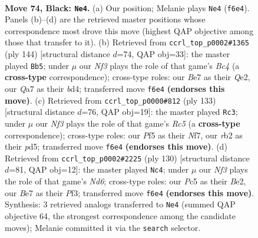 \documentclass[11pt]{article}
\begin{document}
\clearpage

\begin{figure}[p]\centering
\begin{subfigure}{0.46\textwidth}\centering
\resizebox{\linewidth}{!}{%
\newchessgame
\chessboard[
  setfen={r7/q3b1k1/4Qn2/P1p2p2/3p1Pp1/8/1R1BP3/3NK3 b - - 9 74},
  showmover=false,
  pgfstyle=straightmove, color=movearrow, markmove={f6-e4}
]}
\caption{}
\end{subfigure}\hfill
\begin{subfigure}{0.46\textwidth}\centering
\resizebox{\linewidth}{!}{%
\newchessgame
\chessboard[
  setfen={8/1p3pk1/6p1/3Pp3/PqBbP3/6P1/4QPK1/8 w - - 45 73},
  showmover=false,
  pgfstyle=straightmove, color=movearrow, markmove={c4-b5}
]}
\caption{}
\end{subfigure}
\\[4pt]
\begin{subfigure}{0.46\textwidth}\centering
\resizebox{\linewidth}{!}{%
\newchessgame
\chessboard[
  setfen={6k1/2pq1n2/1p3b2/3P1Pp1/1Pr5/p4BB1/P3Q1K1/7R b - - 1 67},
  showmover=false,
  pgfstyle=straightmove, color=movearrow, markmove={c4-c3}
]}
\caption{}
\end{subfigure}\hfill
\begin{subfigure}{0.46\textwidth}\centering
\resizebox{\linewidth}{!}{%
\newchessgame
\chessboard[
  setfen={8/3nkpp1/1p1Nb2p/1P6/3Q3P/q4PP1/4BK2/8 w - - 9 66},
  showmover=false,
  pgfstyle=straightmove, color=movearrow, markmove={d6-c4}
]}
\caption{}
\end{subfigure}
\caption{\textbf{Move 74, Black: \texttt{Ne4}.} (a) Our position; Melanie plays \texttt{Ne4} (\texttt{f6e4}). Panels (b)--(d) are the retrieved master positions whose correspondence most drove this move (highest QAP objective among those that transfer to it). (b) Retrieved from \texttt{ccrl\_top\_p0002\#1365} (ply 144) [structural distance $d$=74, QAP obj=33]: the master played \texttt{Bb5}; under $\mu$ our \emph{Nf3} plays the role of that game's \emph{Bc4} (a \textbf{cross-type} correspondence); cross-type roles: our \emph{B}e7 as their \emph{Q}e2, our \emph{Q}a7 as their \emph{b}d4; transferred move \texttt{f6e4} \textbf{(endorses this move)}. (c) Retrieved from \texttt{ccrl\_top\_p0000\#812} (ply 133) [structural distance $d$=76, QAP obj=19]: the master played \texttt{Rc3}; under $\mu$ our \emph{Nf3} plays the role of that game's \emph{Rc5} (a \textbf{cross-type} correspondence); cross-type roles: our \emph{P}f5 as their \emph{N}f7, our \emph{r}b2 as their \emph{p}d5; transferred move \texttt{f6e4} \textbf{(endorses this move)}. (d) Retrieved from \texttt{ccrl\_top\_p0002\#2225} (ply 130) [structural distance $d$=81, QAP obj=12]: the master played \texttt{Nc4}; under $\mu$ our \emph{Nf3} plays the role of that game's \emph{Nd6}; cross-type roles: our \emph{P}c5 as their \emph{B}e2, our \emph{B}e7 as their \emph{P}f3; transferred move \texttt{f6e4} \textbf{(endorses this move)}. Synthesis: 3 retrieved analogs transferred to \texttt{Ne4} (summed QAP objective 64, the strongest correspondence among the candidate moves); Melanie committed it via the \texttt{search} selector.}
\label{fig:thought-m147}
\end{figure}
\end{document}
